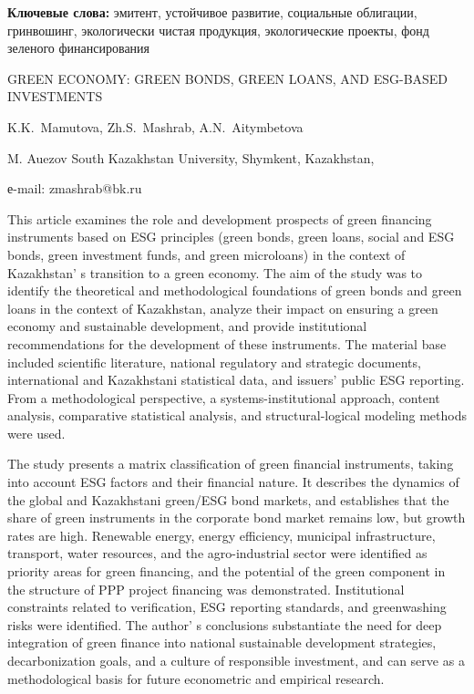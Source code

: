 {\bfseries Ключевые слова:} эмитент, устойчивое развитие, социальные
облигации, гринвошинг, экологически чистая продукция, экологические
проекты, фонд зеленого финансирования
\vspace{1em}
\begin{header}
GREEN ECONOMY: GREEN BONDS, GREEN LOANS, AND ESG-BASED INVESTMENTS

K.K.~Mamutova,
Zh.S.~Mashrab\envelope,
A.N.~Aitymbetova
\end{header}

\begin{affil}
M. Auezov South Kazakhstan University, Shymkent, Kazakhstan,

е-mail: zmashrab@bk.ru
\end{affil}

This article examines the role and development prospects of green
financing instruments based on ESG principles (green bonds, green loans,
social and ESG bonds, green investment funds, and green microloans) in
the context of Kazakhstan' s transition to a green
economy. The aim of the study was to identify the theoretical and
methodological foundations of green bonds and green loans in the context
of Kazakhstan, analyze their impact on ensuring a green economy and
sustainable development, and provide institutional recommendations for
the development of these instruments. The material base included
scientific literature, national regulatory and strategic documents,
international and Kazakhstani statistical data, and
issuers'{} public ESG reporting. From a methodological
perspective, a systems-institutional app\-roach, content analysis,
comparative statistical analysis, and structural-logical modeling
methods were used.

The study presents a matrix classification of green financial
instruments, taking into account ESG factors and their financial nature.
It describes the dynamics of the global and Kazakhstani green/ESG bond
markets, and establishes that the share of green instruments in the
corporate bond market remains low, but growth rates are high. Renewable
energy, energy efficiency, municipal infrastructure, transport, water
resources, and the agro-industrial sector were identified as priority
areas for green financing, and the potential of the green component in
the structure of PPP project financing was demonstrated. Institutional
constraints related to verification, ESG reporting standards, and
greenwashing risks were identified. The author' s
conclusions substantiate the need for deep integration of green finance
into national sustainable development strategies, decarbonization goals,
and a culture of responsible investment, and can serve as a
methodological basis for future econometric and empirical research.


